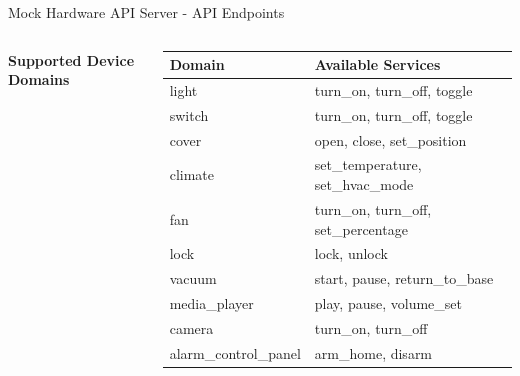 \documentclass[aspectratio=169, 10pt, xcolor=table]{beamer}
\begin{document}
\begin{frame}{Mock Hardware API Server - API Endpoints}
\begin{columns}[t]
            \pause
            \textbf{Supported Device Domains}
            \vspace{0.3em}
            
            {\footnotesize
            \begin{tabular}{l l}
                \toprule
                \textbf{Domain} & \textbf{Available Services} \\
                \midrule
                light & turn\_on, turn\_off, toggle \\
                switch & turn\_on, turn\_off, toggle \\
                cover & open, close, set\_position \\
                climate & set\_temperature, set\_hvac\_mode \\
                fan & turn\_on, turn\_off, set\_percentage \\
                lock & lock, unlock \\
                vacuum & start, pause, return\_to\_base \\
                media\_player & play, pause, volume\_set \\
                camera & turn\_on, turn\_off \\
                alarm\_control\_panel & arm\_home, disarm \\
                \bottomrule
            \end{tabular}
            }
    \end{columns}
\end{frame}

\end{document}
